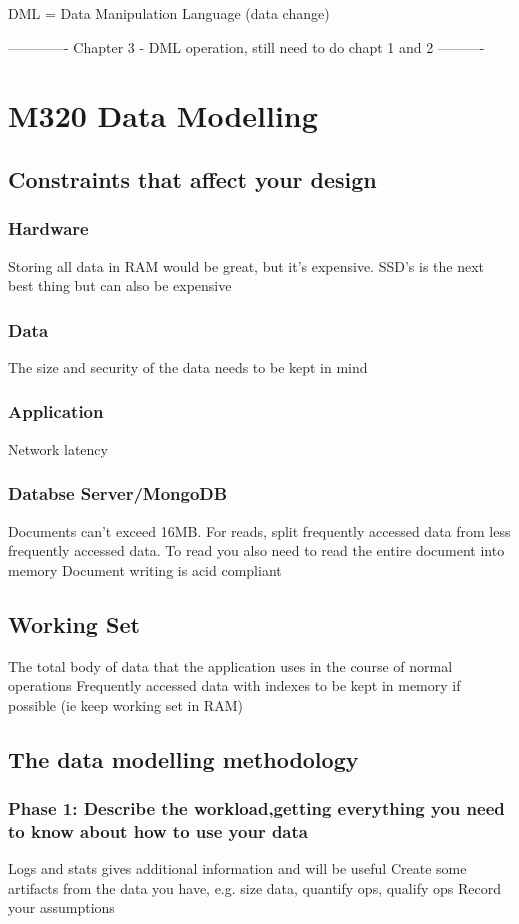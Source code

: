 \documentclass[11pt]{article}
\begin{document}
DML = Data Manipulation Language (data change)


------------- Chapter 3 - DML operation, still need to do chapt 1 and 2 ----------

\section{M320 Data Modelling}
\label{sec:orgba8361d}
\subsection{Constraints that affect your design}
\label{sec:org8e6d27e}
\subsubsection{Hardware}
\label{sec:org8d9a813}
Storing all data in RAM would be great, but it's expensive. SSD's is the next best thing but can also be expensive
\subsubsection{Data}
\label{sec:org5659989}
The size and security of the data needs to be kept in mind
\subsubsection{Application}
\label{sec:org2e88520}
Network latency
\subsubsection{Databse Server/MongoDB}
\label{sec:org0b91c99}
Documents can't exceed 16MB. For reads, split frequently accessed data from less frequently accessed data. To read you also need to read the entire document into memory
Document writing is acid compliant

\subsection{Working Set}
\label{sec:orgcf7ebbf}
The total body of data that the application uses in the course of normal operations
Frequently accessed data with indexes to be kept in memory if possible (ie keep working set in RAM)

\subsection{The data modelling methodology}
\label{sec:orgca903bc}
\subsubsection{Phase 1: Describe the workload,getting everything you need to know about how to use your data}
\label{sec:orgf305478}
Logs and stats gives additional information and will be useful
Create some artifacts from the data you have, e.g. size data, quantify ops, qualify ops
Record your assumptions
\end{document}
